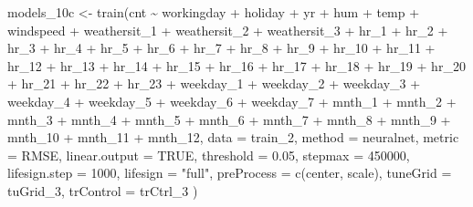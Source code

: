 \documentclass[
]{article}
\newenvironment{Shaded}{\begin{snugshade}}{\end{snugshade}}
\newcommand{\AttributeTok}[1]{\textcolor[rgb]{0.77,0.63,0.00}{#1}}
\newcommand{\ConstantTok}[1]{\textcolor[rgb]{0.00,0.00,0.00}{#1}}
\newcommand{\DecValTok}[1]{\textcolor[rgb]{0.00,0.00,0.81}{#1}}
\newcommand{\FloatTok}[1]{\textcolor[rgb]{0.00,0.00,0.81}{#1}}
\newcommand{\FunctionTok}[1]{\textcolor[rgb]{0.00,0.00,0.00}{#1}}
\newcommand{\NormalTok}[1]{#1}
\newcommand{\OtherTok}[1]{\textcolor[rgb]{0.56,0.35,0.01}{#1}}
\newcommand{\SpecialCharTok}[1]{\textcolor[rgb]{0.00,0.00,0.00}{#1}}
\newcommand{\StringTok}[1]{\textcolor[rgb]{0.31,0.60,0.02}{#1}}
\begin{document}
\begin{Shaded}
\begin{Highlighting}[]
\NormalTok{models\_10c }\OtherTok{\textless{}{-}} \FunctionTok{train}\NormalTok{(cnt }\SpecialCharTok{\textasciitilde{}}\NormalTok{ workingday }\SpecialCharTok{+}\NormalTok{ holiday }\SpecialCharTok{+}\NormalTok{ yr }\SpecialCharTok{+}\NormalTok{ hum }\SpecialCharTok{+}\NormalTok{ temp }\SpecialCharTok{+}\NormalTok{ windspeed }\SpecialCharTok{+}\NormalTok{ weathersit\_1 }\SpecialCharTok{+}\NormalTok{ weathersit\_2 }\SpecialCharTok{+}\NormalTok{ weathersit\_3 }\SpecialCharTok{+}\NormalTok{ hr\_1 }\SpecialCharTok{+}\NormalTok{ hr\_2 }\SpecialCharTok{+}\NormalTok{ hr\_3 }\SpecialCharTok{+}\NormalTok{ hr\_4 }\SpecialCharTok{+}\NormalTok{ hr\_5 }\SpecialCharTok{+}\NormalTok{ hr\_6 }\SpecialCharTok{+}\NormalTok{ hr\_7 }\SpecialCharTok{+}\NormalTok{ hr\_8 }\SpecialCharTok{+}\NormalTok{ hr\_9 }\SpecialCharTok{+}\NormalTok{ hr\_10 }\SpecialCharTok{+}\NormalTok{ hr\_11 }\SpecialCharTok{+}\NormalTok{ hr\_12 }\SpecialCharTok{+}\NormalTok{ hr\_13 }\SpecialCharTok{+}\NormalTok{ hr\_14 }\SpecialCharTok{+}\NormalTok{ hr\_15 }\SpecialCharTok{+}\NormalTok{ hr\_16 }\SpecialCharTok{+}\NormalTok{ hr\_17 }\SpecialCharTok{+}\NormalTok{ hr\_18 }\SpecialCharTok{+}\NormalTok{ hr\_19 }\SpecialCharTok{+}\NormalTok{ hr\_20 }\SpecialCharTok{+}\NormalTok{ hr\_21 }\SpecialCharTok{+}\NormalTok{ hr\_22 }\SpecialCharTok{+}\NormalTok{ hr\_23 }\SpecialCharTok{+}\NormalTok{ weekday\_1 }\SpecialCharTok{+}\NormalTok{ weekday\_2 }\SpecialCharTok{+}\NormalTok{ weekday\_3 }\SpecialCharTok{+}\NormalTok{ weekday\_4 }\SpecialCharTok{+}\NormalTok{ weekday\_5 }\SpecialCharTok{+}\NormalTok{ weekday\_6 }\SpecialCharTok{+}\NormalTok{ weekday\_7 }\SpecialCharTok{+}\NormalTok{ mnth\_1 }\SpecialCharTok{+}\NormalTok{ mnth\_2 }\SpecialCharTok{+}\NormalTok{ mnth\_3 }\SpecialCharTok{+}\NormalTok{ mnth\_4 }\SpecialCharTok{+}\NormalTok{ mnth\_5 }\SpecialCharTok{+}\NormalTok{ mnth\_6 }\SpecialCharTok{+}\NormalTok{ mnth\_7 }\SpecialCharTok{+}\NormalTok{ mnth\_8 }\SpecialCharTok{+}\NormalTok{ mnth\_9 }\SpecialCharTok{+}\NormalTok{ mnth\_10 }\SpecialCharTok{+}\NormalTok{ mnth\_11 }\SpecialCharTok{+}\NormalTok{ mnth\_12, }\AttributeTok{data =}\NormalTok{ train\_2,}
  \AttributeTok{method =} \StringTok{\textquotesingle{}neuralnet\textquotesingle{}}\NormalTok{,}
  \AttributeTok{metric =} \StringTok{\textquotesingle{}RMSE\textquotesingle{}}\NormalTok{,}
  \AttributeTok{linear.output =} \ConstantTok{TRUE}\NormalTok{,}
  \AttributeTok{threshold =} \FloatTok{0.05}\NormalTok{,}
  \AttributeTok{stepmax =} \DecValTok{450000}\NormalTok{,}
  \AttributeTok{lifesign.step =} \DecValTok{1000}\NormalTok{,}
  \AttributeTok{lifesign =} \StringTok{"full"}\NormalTok{,}
  \AttributeTok{preProcess =} \FunctionTok{c}\NormalTok{(}\StringTok{\textquotesingle{}center\textquotesingle{}}\NormalTok{, }\StringTok{\textquotesingle{}scale\textquotesingle{}}\NormalTok{),}
  \AttributeTok{tuneGrid =}\NormalTok{ tuGrid\_3,}
  \AttributeTok{trControl =}\NormalTok{ trCtrl\_3}
\NormalTok{  )}
\end{Highlighting}
\end{Shaded}
\end{document}
